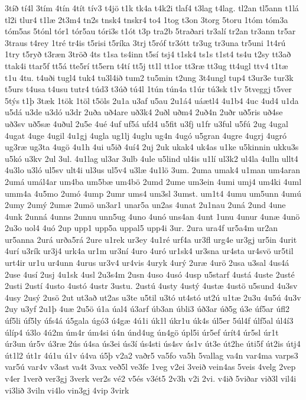 {3tíð
tí4l
3tím
4tín
4tít
tív3
t4jö
t1k
tk4a
t4k2i
tlaf4
t3lag
t4lag.
tl2an
tl5ann
t1lá
tl2i
tlur4
t1læ
2t3m4
tn2s
tnsk4
tnskr4
to4
1tog
t3on
3torg
5toru
1tóm
tóm3a
tóm5as
5tónl
tór1
tór5au
tóri3s
t1ót
t3p
tra2b
5traðari
tr3alí
tr2an
tr3ann
tr5ar
3traus
t4rey
1tré
tr4is
t5risi
t5ríka
3trj
t5róf
tr3ótt
tr3ug
tr3una
tr5uni
1t4rú
1try
t5ryð
t3ræn
3tröð
4ts
t1sa
ts4inn
t5sí
tsj4
t1sk4
ts1s
t1st4
ts4u
t2sy
tt3að
ttak4i
ttar5f
tt5á
tte5rí
tt5ern
t4tí
tt5j
tt1l
tt1or
tt3ræ
tt3ug
tt4ugl
ttv4
t1tæ
t1u
4tu.
t4uði
tugl4
tuk4
tu3l4ið
tum2
tu5min
t2ung
3t4ungl
tup4
t3ur3e
tur3k
t5urs
t4usa
t4usu
tutr4
túd3
t3úð
tú4l
1tún
tún4a
t1úr
tú3sk
t1v
5tveggj
t5ver
5týs
t1þ
3tæk
1tök
1töl
t5öls
2u1a
u3af
u5au
2u1á4
uáætl4
4u1b4
4uc
4ud4
u1da
u5dá
u3de
u3dó
u3dr
2uða
uð4are
uð3k4
2uðl
uðm4
2uð4n
2uðr
uð5ris
uð4se
uð3sv
uð5sæ
4uðul
2u5e
4ué
4uf
uf5á
ufd4
u5fit
u3fj
u1fr
u3ful
u5fú
2ug
4ugal
4ugat
4uge
4ugil
4u1gj
4ugla
ug1lj
4uglu
ug4n
4ugó
u5gran
4ugre
4ugrj
4ugró
ug3ræ
ug3ta
4ugö
4u1h
4ui
u5ið
4uí4
2uj
2uk
ukak4
uk4as
u1ke
u5kinnin
ukku3s
u5kó
u3kv
2ul
3ul.
4u1lag
ul3ar
3ulb
4ule
u5lind
ul4is
u1lí
ul3k2
ul4la
4ulln
ullt4
4u3lo
u3ló
ul5sv
ult4i
ul3us
ul5v4
u3læ
4u1lö
3um.
2uma
umak4
u1man
um4aran
2umá
umál4ar
um4ba
um5bæ
um4bö
2umd
2ume
um3ein
4umi
umj4
um4ki
4uml
umm4a
4u5mo
2umó
4ump
2umr
ums4
um3sl
3umst.
um1t4
4umu
um5unn
4umú
2umy
2umý
2umæ
2umö
un3ar1
unar5a
un2as
4unat
2u1nau
2uná
2und
4une
4unk
2unná
4unns
2unnu
unn5ug
4uno
4unó
uns4an
4unt
1unu
4unur
4unæ
4unö
2u3o
uol4
4uó
2up
upp1
upp5a
uppal5
upp4i
3ur.
2ura
ura4f
ur5a4m
ur2an
ur5anna
2urá
urða5rá
2ure
u1rek
ur3ey
4u1ré
urf4a
ur3fl
urg4e
ur3gj
ur5in
4urit
4urí
u3rík
ur3j4
urk4a
ur1m
ur3ní
4uro
4uró
ur1sk4
ur3sna
ur4sta
ur4svö
ur5til
urt4ir
ur1u
ur4unn
4urus
ur3v4
ur4vis
4uryk
4urý
2uræ
4urö
2usa
u3sal
4us4á
2use
4usí
2usj
4u1sk
4usl
2u3s4m
2usn
4uso
4usó
4usp
u5starf
4ustá
4uste
2usté
2usti
2ustí
4usto
4ustó
4ustr
3ustu.
2ustú
4usty
4ustý
4ustæ
4ustö
u5sund
4u3sv
4usy
2usý
2usö
2ut
ut3að
ut2as
u3te
u5til
u3tó
ut4stó
ut2ú
u1tæ
2u3u
4u5ú
4u3v
2uy
u3yf
2u1þ
4uæ
2u5ö
ú1a
úal4
ú3arf
úb3an
úbli3
úð3ar
úð5g
ú3e
úf5ar
úfl2
úf5li
úf5ly
úfs4á
ú5gala
úgó3
ú4gæ
4ú1i
úk1l
úkr1u
úk4s
úl5er
5úl4f
úlf5al
úl4í3
úlíp4
ú3lo
4ú2m
úm4r
úm4si
ú4n
únd4ug
ún4gö
úpl5i
úr5ef
úrít4
úr5sl
úr1t
úr3un
úr5v
ú3ræ
2ús
ú4sa
ús3ei
ús3í
ús4sti
ús4sv
ús1v
út3e
út2he
úti5f
út2is
útj4
út1l2
út1r
4ú1u
ú1v
ú4va
ú5þ
v2a2
vaðr5
va5fo
va5h
5vallag
va4n
var4ma
varps3
var5ú
var4v
v3ast
va4t
3vax
veð5l
ve3fe
1veg
v2ei
3veið
vein4as
5veis
4velg
2vep
v4er
1verð
ver3gj
3verk
ver2s
vé2
v5és
v3ét5
2v3h
v2i
2vi.
v4ið
5viðar
við3l
vil4i
vi3lið
3viln
vi4lo
vin3gj
4vip
3virk
}
